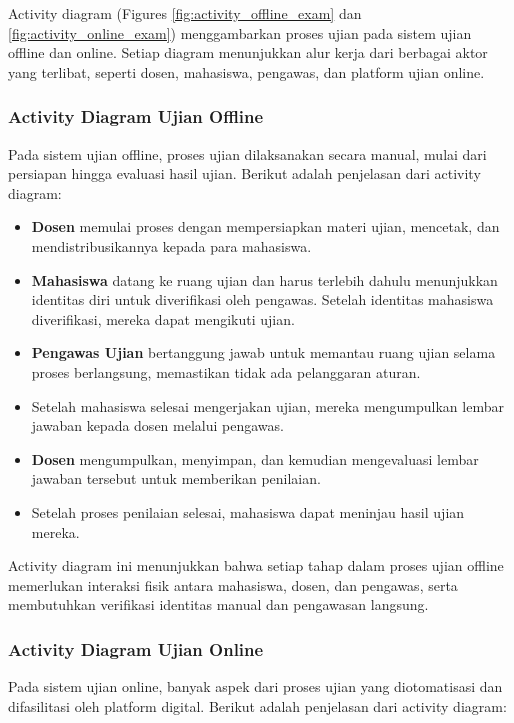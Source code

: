 Activity diagram (Figures \ref{fig:activity_offline_exam} dan \ref{fig:activity_online_exam}) menggambarkan proses ujian pada sistem ujian offline dan online. Setiap diagram menunjukkan alur kerja dari berbagai aktor yang terlibat, seperti dosen, mahasiswa, pengawas, dan platform ujian online.

\subsubsection{Activity Diagram Ujian Offline}

Pada sistem ujian offline, proses ujian dilaksanakan secara manual, mulai dari persiapan hingga evaluasi hasil ujian. Berikut adalah penjelasan dari activity diagram:

\begin{itemize}
	\item \textbf{Dosen} memulai proses dengan mempersiapkan materi ujian, mencetak, dan mendistribusikannya kepada para mahasiswa.
	\item \textbf{Mahasiswa} datang ke ruang ujian dan harus terlebih dahulu menunjukkan identitas diri untuk diverifikasi oleh pengawas. Setelah identitas mahasiswa diverifikasi, mereka dapat mengikuti ujian.
	\item \textbf{Pengawas Ujian} bertanggung jawab untuk memantau ruang ujian selama proses berlangsung, memastikan tidak ada pelanggaran aturan.
	\item Setelah mahasiswa selesai mengerjakan ujian, mereka mengumpulkan lembar jawaban kepada dosen melalui pengawas.
	\item \textbf{Dosen} mengumpulkan, menyimpan, dan kemudian mengevaluasi lembar jawaban tersebut untuk memberikan penilaian.
	\item Setelah proses penilaian selesai, mahasiswa dapat meninjau hasil ujian mereka.
\end{itemize}

Activity diagram ini menunjukkan bahwa setiap tahap dalam proses ujian offline memerlukan interaksi fisik antara mahasiswa, dosen, dan pengawas, serta membutuhkan verifikasi identitas manual dan pengawasan langsung.

\subsubsection{Activity Diagram Ujian Online}

Pada sistem ujian online, banyak aspek dari proses ujian yang diotomatisasi dan difasilitasi oleh platform digital. Berikut adalah penjelasan dari activity diagram:

